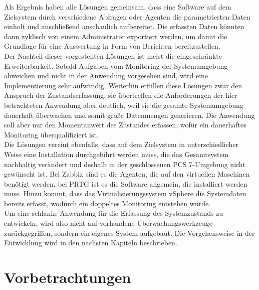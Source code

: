 Als Ergebnis haben alle Lösungen gemeinsam, dass eine Software auf dem Zielsystem durch verschiedene Abfragen oder Agenten die parametrierten Daten einholt und anschließend anschaulich aufbereitet. Die erfassten Daten könnten dann zyklisch von einem Administrator exportiert werden, um damit die Grundlage für eine Auswertung in Form von Berichten bereitzustellen.\medskip\\Der Nachteil dieser vorgestellten Lösungen ist meist die eingeschränkte Erweiterbarkeit. Sobald Aufgaben vom Monitoring der Systemumgebung abweichen und nicht in der Anwendung vorgesehen sind, wird eine Implementierung sehr aufwändig. Weiterhin erfüllen diese Lösungen zwar den Anspruch der Zustandserfassung, sie übertreffen die Anforderungen der hier betrachteten Anwendung aber deutlich, weil sie die gesamte Systemumgebung dauerhaft überwachen und somit große Datenmengen generieren. Die Anwendung soll aber nur den Momentanwert des Zustandes erfassen, wofür ein dauerhaftes Monitoring überqualifiziert ist.\medskip\\Die Lösungen vereint ebenfalls, dass auf dem Zielsystem in unterschiedlicher Weise eine Installation durchgeführt werden muss, die das Gesamtsystem nachhaltig verändert und deshalb in der geschlossenen PCS 7-Umgebung nicht gewünscht ist. Bei Zabbix sind es die Agenten, die auf den virtuellen Maschinen benötigt werden, bei PRTG ist es die Software allgemein, die installiert werden muss. Hinzu kommt, dass das Virtualisierungssystem vSphere die Systemdaten bereits erfasst, wodurch ein doppeltes Monitoring entstehen würde.\medskip\\
Um eine schlanke Anwendung für die Erfassung des Systemzustands zu entwickeln, wird also nicht auf vorhandene Überwachungswerkzeuge zurückgegriffen, sondern ein eigenes System aufgebaut. Die Vorgehensweise in der Entwicklung wird in den nächsten Kapiteln beschrieben.
\chapter{Vorbetrachtungen}
